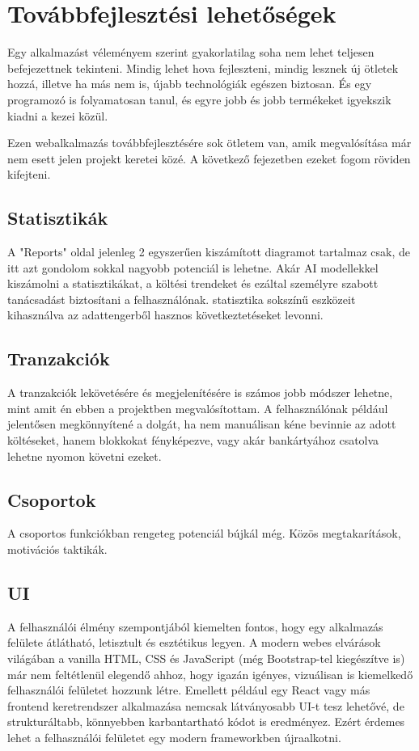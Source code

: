 \chapter{Továbbfejlesztési lehetőségek}
\label{ch:future}

Egy alkalmazást véleményem szerint gyakorlatilag soha nem lehet teljesen befejezettnek tekinteni. Mindig lehet hova fejleszteni, mindig lesznek új ötletek hozzá, illetve ha más nem is, újabb technológiák egészen biztosan. És egy programozó is folyamatosan tanul, és egyre jobb és jobb termékeket igyekszik kiadni a kezei közül.

Ezen webalkalmazás továbbfejlesztésére sok ötletem van, amik megvalósítása már nem esett jelen projekt keretei közé. A következő fejezetben ezeket fogom röviden kifejteni.

\section{Statisztikák}
A "Reports" oldal jelenleg 2 egyszerűen kiszámított diagramot tartalmaz csak, de itt azt gondolom sokkal nagyobb potenciál is lehetne. Akár AI modellekkel kiszámolni a statisztikákat, a költési trendeket és ezáltal személyre szabott tanácsadást biztosítani a felhasználónak. statisztika sokszínű eszközeit kihasználva az adattengerből hasznos következtetéseket levonni.
\section{Tranzakciók}
A tranzakciók lekövetésére és megjelenítésére is számos jobb módszer lehetne, mint amit én ebben a projektben megvalósítottam. A felhasználónak például jelentősen megkönnyítené a dolgát, ha nem manuálisan kéne bevinnie az adott költéseket, hanem blokkokat fényképezve, vagy akár bankártyához csatolva lehetne nyomon követni ezeket.
\section{Csoportok}
A csoportos funkciókban rengeteg potenciál bújkál még. Közös megtakarítások, motivációs taktikák.
\section{UI}
A felhasználói élmény szempontjából kiemelten fontos, hogy egy alkalmazás felülete átlátható, letisztult és esztétikus legyen. A modern webes elvárások világában a vanilla HTML, CSS és JavaScript (még Bootstrap-tel kiegészítve is) már nem feltétlenül elegendő ahhoz, hogy igazán igényes, vizuálisan is kiemelkedő felhasználói felületet hozzunk létre. Emellett például egy React vagy más frontend keretrendszer alkalmazása nemcsak látványosabb UI-t tesz lehetővé, de strukturáltabb, könnyebben karbantartható kódot is eredményez. Ezért érdemes lehet a felhasználói felületet egy modern frameworkben újraalkotni.
